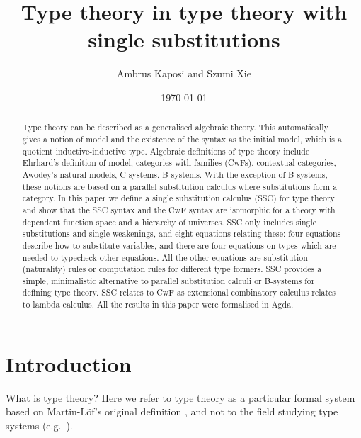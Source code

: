\documentclass[sigplan,10pt,anonymous,review]{acmart}\settopmatter{printfolios=true,printccs=false,printacmref=false}
\begin{document}
\newtheorem{problem}[theorem]{Problem}
\theoremstyle{remark}
\newtheorem{construction}[theorem]{Construction}

\title{Type theory in type theory with single substitutions}
\author{Ambrus Kaposi and Szumi Xie}
\date{\today}

\begin{abstract}
Type theory can be described as a generalised algebraic theory. This
automatically gives a notion of model and the existence of the syntax
as the initial model, which is a quotient inductive-inductive
type. Algebraic definitions of type theory include Ehrhard's
definition of model, categories with families (CwFs), contextual
categories, Awodey's natural models, C-systems, B-systems. With the
exception of B-systems, these notions are based on a parallel
substitution calculus where substitutions form a category. In this
paper we define a single substitution calculus (SSC) for type theory
and show that the SSC syntax and the CwF syntax are isomorphic for a
theory with dependent function space and a hierarchy of universes. SSC
only includes single substitutions and single weakenings, and eight
equations relating these: four equations describe how to substitute
variables, and there are four equations on types which are needed to
typecheck other equations. All the other equations are substitution
(naturality) rules or computation rules for different type
formers. SSC provides a simple, minimalistic alternative to parallel
substitution calculi or B-systems for defining type theory. SSC
relates to CwF as extensional combinatory calculus relates to lambda
calculus. All the results in this paper were formalised in Agda.
\end{abstract}

\maketitle

\section{Introduction}

What is type theory? Here we refer to type theory as a particular
formal system based on Martin-Löf's original definition
\cite{martinlof73predicative}, and not to the field studying type
systems (e.g.\ \cite{DBLP:books/daglib/0005958}).
\end{document}

